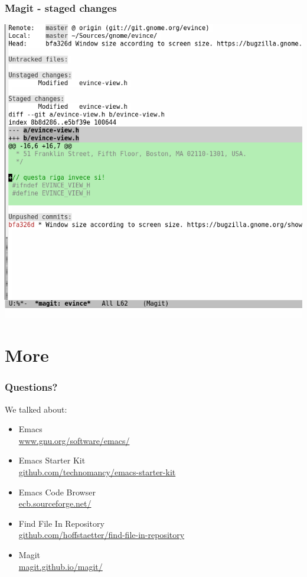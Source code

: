 \documentclass{beamer}
\begin{document}
\begin{frame}
\frametitle{Magit - staged changes}
\centering
\includegraphics[height=0.9\textheight]{images/magit_staged_changes.png}
\end{frame}

\section{More}
\begin{frame}
\frametitle{Questions?}
\begin{block}{We talked about:}
\begin{itemize}
\item Emacs\\
  \url{www.gnu.org/software/emacs/}
\item Emacs Starter Kit\\
  \url{github.com/technomancy/emacs-starter-kit}
\item Emacs Code Browser\\
  \url{ecb.sourceforge.net/}
\item Find File In Repository\\
  \url{github.com/hoffstaetter/find-file-in-repository}
\item Magit\\
  \url{magit.github.io/magit/}
\end{itemize}
\end{block}
\end{frame}
\end{document}
